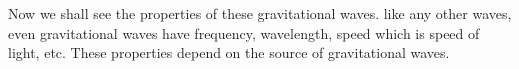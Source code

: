 Now we shall see the properties of these gravitational waves. like any other waves, even gravitational waves have frequency, wavelength, speed which is speed of light, etc. These properties depend on the source of gravitational waves. 